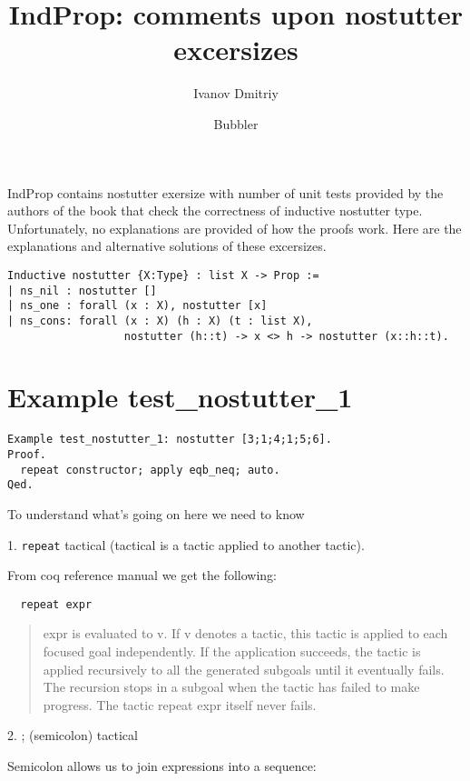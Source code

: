 \documentclass[12pt]{article}
\title{IndProp: comments upon nostutter excersizes}
\author{Ivanov Dmitriy
\and
Bubbler
}
\begin{document}
\maketitle
\tableofcontents

\vspace{3em}
IndProp contains nostutter exersize with number of unit tests provided by the authors of the book that check the correctness of inductive nostutter type. Unfortunately, no explanations are provided of how the proofs work. Here are the explanations and alternative solutions of these excersizes.

\begin{verbatim}
Inductive nostutter {X:Type} : list X -> Prop :=
| ns_nil : nostutter []
| ns_one : forall (x : X), nostutter [x]
| ns_cons: forall (x : X) (h : X) (t : list X),
                  nostutter (h::t) -> x <> h -> nostutter (x::h::t).
\end{verbatim}

\section{Example test\_nostutter\_1}

\begin{verbatim}
Example test_nostutter_1: nostutter [3;1;4;1;5;6].
Proof.
  repeat constructor; apply eqb_neq; auto.
Qed.
\end{verbatim}

To understand what's going on here we need to know

1. {\tt repeat} tactical (tactical is a tactic applied to another tactic).

From coq reference manual we get the following:

\begin{verbatim}
  repeat expr
\end{verbatim}

\begin{quote}
expr is evaluated to v. If v denotes a tactic, this tactic is applied to each focused goal independently. If
the application succeeds, the tactic is applied recursively to all the generated subgoals until it eventually
fails. The recursion stops in a subgoal when the tactic has failed to make progress. The tactic repeat
expr itself never fails.
\end{quote}

2. ; (semicolon) tactical

Semicolon allows us to join expressions into a sequence:
\end{document}
